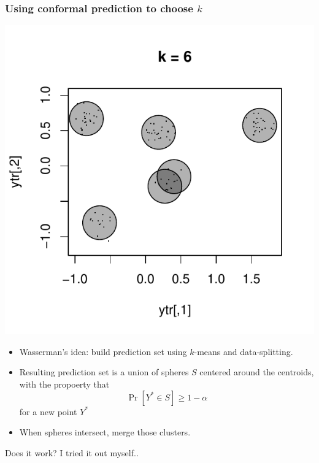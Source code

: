 \documentclass{beamer}
\begin{document}
\begin{frame}
\frametitle{Using conformal prediction to choose $k$}
\begin{center}
\includegraphics[scale = 0.3, clip = true, trim = 0.3in 0.4in 0.3in 0.2in]{../conformal_kmeans/k6.pdf}
\end{center}
\begin{itemize}
\item Wasserman's idea: build prediction set using $k$-means and data-splitting. \pause
\item Resulting prediction set is a union of spheres $S$ centered around the centroids, with the propoerty that
\[
\Pr[Y^* \in S] \geq 1 -\alpha
\]
for a new point $Y^*$ \pause
\item When spheres intersect, merge those clusters.\pause
\end{itemize}
Does it work?  I tried it out myself..
\end{frame}
\end{document}
